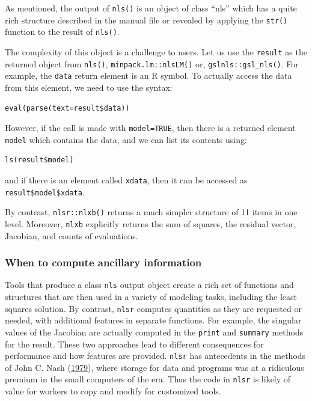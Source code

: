 \documentclass[
]{article}
\begin{document}
As mentioned, the output of \texttt{nls()} is an object of class ``nls''
which has a quite rich structure described in the manual file or
revealed by applying the \texttt{str()} function to the result of
\texttt{nls()}.

The complexity of this object is a challenge to users. Let us use the
\texttt{result} as the returned object from \texttt{nls()},
\texttt{minpack.lm::nlsLM()} or, \texttt{gslnls::gsl\_nls()}. For
example, the \texttt{data} return element is an R symbol. To actually
access the data from this element, we need to use the syntax:

\begin{verbatim}
eval(parse(text=result$data))
\end{verbatim}

However, if the call is made with \texttt{model=TRUE}, then there is a
returned element \texttt{model} which contains the data, and we can list
its contents using:

\begin{verbatim}
ls(result$model)
\end{verbatim}

and if there is an element called \texttt{xdata}, then it can be
accessed as \texttt{result\$model\$xdata}.

By contrast, \texttt{nlsr::nlxb()} returns a much simpler structure of
11 items in one level. Moreover, \texttt{nlxb} explicitly returns the
sum of squares, the residual vector, Jacobian, and counts of
evaluations.

\hypertarget{when-to-compute-ancillary-information}{%
\subsubsection{When to compute ancillary
information}\label{when-to-compute-ancillary-information}}

Tools that produce a class \texttt{nls} output object create a rich set
of functions and structures that are then used in a variety of modeling
tasks, including the least squares solution. By contrast, \texttt{nlsr}
computes quantities as they are requested or needed, with additional
features in separate functions. For example, the singular values of the
Jacobian are actually computed in the \texttt{print} and
\texttt{summary} methods for the result. These two approaches lead to
different consequences for performance and how features are provided.
\texttt{nlsr} has antecedents in the methods of John C. Nash
(\protect\hyperlink{ref-cnm79}{1979}), where storage for data and
programs was at a ridiculous premium in the small computers of the era.
Thus the code in \texttt{nlsr} is likely of value for workers to copy
and modify for customized tools.
\end{document}
